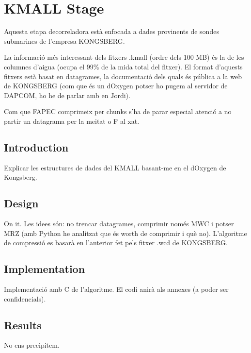 \chapter{KMALL Stage}
Aquesta etapa decorreladora està enfocada a dades provinents de sondes submarines de l'empresa KONGSBERG.

La informació més interessant dels fitxers .kmall (ordre dels 100 MB) és la de les columnes d'aigua (ocupa el 99\% de la mida total del fitxer). El format d'aquests fitxers està basat en datagrames, la documentació dels quals és pública a la web de KONGSBERG (com que és un dOxygen potser ho pugem al servidor de DAPCOM, ho he de parlar amb en Jordi).

Com que FAPEC comprimeix per chunks s'ha de parar especial atenció a no partir un datagrama per la meitat o F al xat.

\section{Introduction}
Explicar les estructures de dades del KMALL basant-me en el dOxygen de Kongsberg.

\section{Design}
On it. Les idees són: no trencar datagrames, comprimir només MWC i potser MRZ (amb Python he analitzat que és worth de comprimir i què no). L'algoritme de compressió es basarà en l'anterior fet pels fitxer .wcd de KONGSBERG.

\section{Implementation}
Implementació amb C de l'algoritme. El codi anirà als annexes (a poder ser confidencials).

\section{Results}
No ens precipitem.